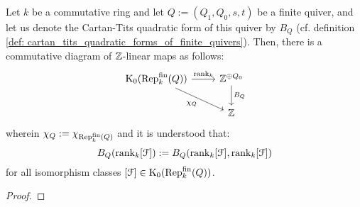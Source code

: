             \begin{theorem} \label{theorem: cartan_tits_quadratic_forms_as_euler_characteristics}
                Let $k$ be a commutative ring and let $Q := (Q_1, Q_0, s, t)$ be a finite quiver, and let us denote the Cartan-Tits quadratic form of this quiver by $B_Q$ (cf. definition \ref{def: cartan_tits_quadratic_forms_of_finite_quivers}). Then, there is a commutative diagram of $\mathbb{Z}$-linear maps as follows:
                    $$
                        \begin{tikzcd}
                        	{\K_0(\Rep_k^{\fin}(Q))} & {\Z^{\oplus Q_0}} \\
                        	& \Z
                        	\arrow["{\rank_k}", from=1-1, to=1-2]
                        	\arrow["{B_Q}", from=1-2, to=2-2]
                        	\arrow["\chi_Q"', from=1-1, to=2-2]
                        \end{tikzcd}
                    $$
                wherein $\chi_Q := \chi_{\mathrm{Rep}_k^{\mathrm{fin}}(Q)}$ and it is understood that:
                    $$B_Q(\operatorname{rank}_k [\mathcal{F}]) := B_Q(\operatorname{rank}_k [\mathcal{F}], \operatorname{rank}_k [\mathcal{F}])$$
                for all isomorphism classes $[\mathcal{F}] \in \mathrm{K}_0(\mathrm{Rep}_k^{\mathrm{fin}}(Q))$.
            \end{theorem}
                \begin{proof}
                    
                \end{proof}
            
